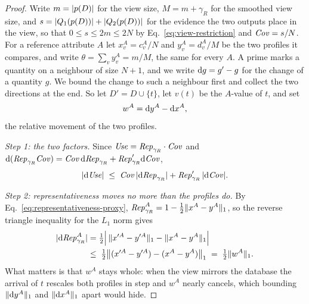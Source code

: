 \begin{proof}
Write $m=|p(D)|$ for the view size, $M=m+\gamma_R$ for the smoothed view size, and
$s=|Q_1(p(D))|+|Q_2(p(D))|$ for the evidence the two outputs place in the view, so that
$0\le s\le2m\le2N$ by Eq.~\eqref{eq:view-restriction} and $\mathit{Cov}=s/N$.
For a reference attribute $A$ let $x^A_v=c^A_v/N$ and $y^A_v=d^A_v/M$ be the two profiles it
compares, and write $\theta=\sum_v y^A_v=m/M$, the same for every $A$.
A prime marks a quantity on a neighbour of size $N+1$, and we write $\mathrm{d} g=g'-g$ for the change of a quantity $g$.
We bound the change to such a neighbour first and collect the two directions at the end.
So let $D'=D\cup\{t\}$, let $v(t)$ be the $A$-value of $t$, and set
\[
w^A=\mathrm{d} y^A-\mathrm{d} x^A ,
\]
the relative movement of the two profiles.

\emph{Step 1: the two factors.}
Since $\mathit{Use}=\mathit{Rep}_{\gamma_R}\cdot\mathit{Cov}$ and
$\mathrm{d}(\mathit{Rep}_{\gamma_R}\mathit{Cov})=\mathit{Cov}\,\mathrm{d}\mathit{Rep}_{\gamma_R}+\mathit{Rep}'_{\gamma_R}\mathrm{d}\mathit{Cov}$,
\begin{equation}
|\mathrm{d}\mathit{Use}|\;\le\;\mathit{Cov}\,|\mathrm{d}\mathit{Rep}_{\gamma_R}|+\mathit{Rep}'_{\gamma_R}\,|\mathrm{d}\mathit{Cov}| .
\label{eq:use-split}
\end{equation}

\emph{Step 2: representativeness moves no more than the profiles do.}
By Eq.~\eqref{eq:representativeness-proxy}, $\mathit{Rep}^A_{\gamma_R}=1-\tfrac12\|x^A-y^A\|_1$, so the
reverse triangle inequality for the $L_1$ norm gives
\begin{align*}
|\mathrm{d}\mathit{Rep}^A_{\gamma_R}|&=\tfrac12\Big|\,\|x'^A-y'^A\|_1-\|x^A-y^A\|_1\Big|\\
&\le\;\tfrac12\big\|(x'^A-y'^A)-(x^A-y^A)\big\|_1\;=\;\tfrac12\|w^A\|_1 .
\end{align*}
What matters is that $w^A$ stays whole: when the view mirrors the database the arrival of $t$
rescales both profiles in step and $w^A$ nearly cancels, which bounding $\|\mathrm{d} y^A\|_1$ and
$\|\mathrm{d} x^A\|_1$ apart would hide.


\end{proof}
